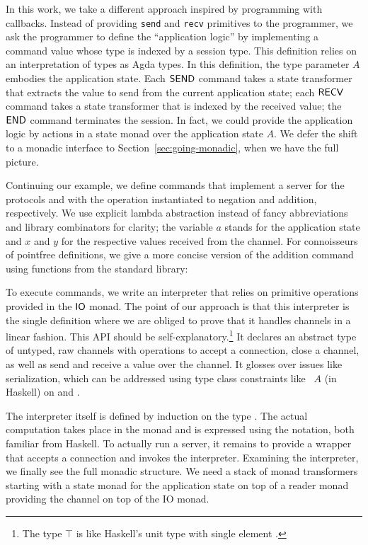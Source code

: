 \documentclass[acmsmall,screen,anonymous,review]{acmart}
\begin{document}
In this work, we take a different approach inspired by programming with
callbacks. Instead of providing \texttt{send} and \texttt{recv}
primitives to the programmer, we ask the programmer to define the
``application logic'' by implementing a command value whose type {\ACommand} is indexed by
a session type. This definition relies on an interpretation of
types as Agda types.
\stTypeInterpretation
\stCommand
In this definition, the type parameter $A$ embodies the application state. 
Each $\ACSEND$ command takes a state transformer that extracts the value to
send from the current application state; each $\ACRECV$ command takes
a state transformer that is indexed by the received value; the $\ACEND$
command terminates the session. In fact, we could provide the
application logic by actions in a state monad over the application
state $A$. We defer the shift to a monadic interface to Section~\ref{sec:going-monadic},
when we have the full picture.

Continuing our example, we define commands that implement a server
for the protocols {\Aunaryp} and {\Abinaryp} with the operation instantiated to
negation and addition, respectively.
\stNegpCommand
\stAddpCommand  
 We use explicit lambda abstraction instead of fancy abbreviations and library combinators
for clarity; the variable $a$ stands for the application state and $x$ and $y$ for
the respective values received from the channel. For connoisseurs of pointfree definitions, we give a
more concise version of the addition command using functions from the
standard library:
\stAddpCommandAlternative

To execute commands, we write an
interpreter that relies on primitive operations provided
in the $\AIO$ monad. The point of our approach is that this
interpreter is the single definition where we are obliged to prove
that it handles channels in a linear fashion. 
\stPostulates
This API should be self-explanatory.\footnote{The type $\top$ is like
  Haskell's unit type with single element {\Att}.} It declares an abstract type of
untyped, raw channels with operations to accept a connection, close a channel, as
well as send and receive a value over the channel. It glosses over issues like
serialization, which can be addressed using type class constraints like
{\ASerialize~$A$} (in Haskell) on {\AprimSend} and {\AprimRecv}.

The interpreter itself is defined by induction on the type
{\ACommand}. The actual computation takes place in the {\AIO} monad and is expressed using the {\Ado} notation, both
familiar from Haskell. 
\stExecutorSignature\vspace{-1.5\baselineskip}
\stExecutor
To actually run a server, it remains to provide a wrapper that accepts
a connection and invokes the interpreter.
\stAcceptor
Examining the interpreter, we finally see the full monadic
structure. We need a stack of monad transformers starting with a state
monad for the application state on top of a reader monad providing the
channel on top of the IO monad.
\end{document}
